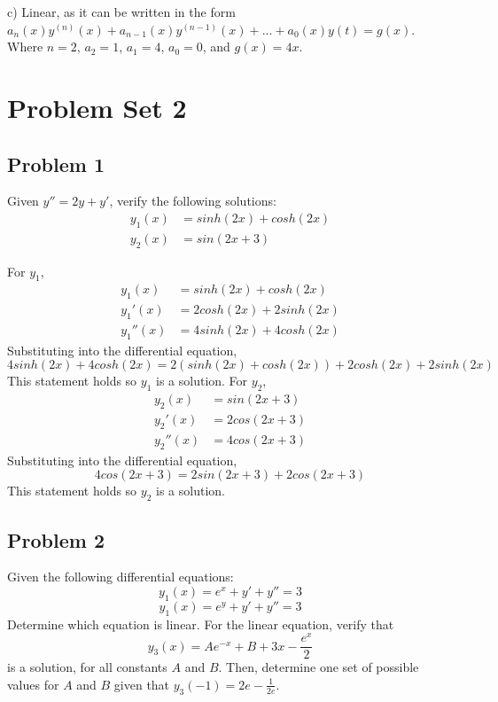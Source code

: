 \documentclass{article}
\begin{document}
\vspace{1em}
\noindent
c) Linear, as it can be written in the form
$a_n(x)y^{(n)}(x) + a_{n-1}(x)y^{(n-1)}(x) + ... + a_0(x)y(t) = g(x)$.
Where $n = 2$,
$a_2 = 1$,
$a_1 = 4$,
$a_0 = 0$, and
$g(x) = 4x$.

\noindent
\section{Problem Set 2}
\subsection{Problem 1}
Given $y'' = 2y + y'$, verify the following solutions:
\begin{align*}
y_1(x) &= sinh(2x) + cosh(2x)
\\ y_2(x) &= sin(2x+3)
\end{align*}

For $y_1$,
\begin{align*}
y_1(x) &= sinh(2x) + cosh(2x)
\\ y_1'(x) &= 2cosh(2x) + 2sinh(2x)
\\ y_1''(x) &= 4sinh(2x) + 4cosh(2x)
\end{align*}
Substituting into the differential equation,
$$4sinh(2x) + 4cosh(2x) = 2(sinh(2x) + cosh(2x)) + 2cosh(2x) + 2sinh(2x)$$
This statement holds so $y_1$ is a solution. For $y_2$,
\begin{align*}
y_2(x) &= sin(2x+3)
\\ y_2'(x) &= 2cos(2x+3)
\\ y_2''(x) &= 4cos(2x+3)
\end{align*}
Substituting into the differential equation,
$$4cos(2x+3) = 2sin(2x+3) + 2cos(2x+3)$$
This statement holds so $y_2$ is a solution.

\subsection{Problem 2}
Given the following differential equations:
$$y_1(x) = e^x + y' + y'' = 3$$
$$y_1(x) = e^y + y' + y'' = 3$$
Determine which equation is linear. For the linear equation, verify that
$$y_3(x) = Ae^{-x} + B + 3x - \frac{e^x}{2}$$
is a solution, for all constants $A$ and $B$. Then, determine one set of possible values for $A$ and $B$ given that $y_3(-1) = 2e - \frac{1}{2e}$.
\end{document}
